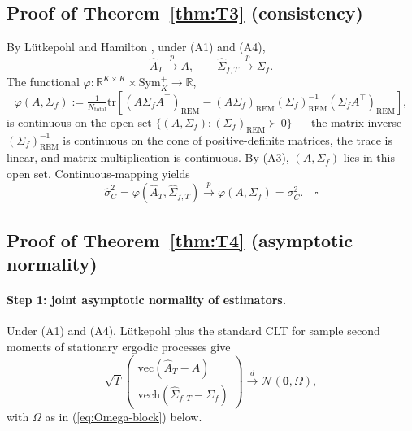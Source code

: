 \documentclass[11pt,letterpaper]{article}
\theoremstyle{remark}
\newcommand{\REM}{\mathrm{REM}}
\newcommand{\Sigmaf}{\Sigma_f}
\newcommand{\Ntot}{N_{\mathrm{total}}}
\newcommand{\sigC}{\sigma^2_C}
\newcommand{\hatsigC}{\widehat{\sigma}^2_C}
\newcommand{\Ehat}{\widehat{A}}
\newcommand{\trace}{\mathrm{tr}}
\newcommand{\vech}{\mathrm{vech}}
\begin{document}
\subsection{Proof of Theorem~\ref{thm:T3} (consistency)}

By Lütkepohl \cite[Proposition~3.1, p.~74]{Lutkepohl2005} and Hamilton \cite[Proposition~11.1, p.~298]{Hamilton1994}, under (A1) and (A4),
\begin{equation*}
\Ehat_T \xrightarrow{p} A, \qquad \widehat{\Sigma}_{f, T} \xrightarrow{p} \Sigmaf.
\end{equation*}
The functional $\varphi : \mathbb{R}^{K \times K} \times \mathrm{Sym}_K^+ \to \mathbb{R}$,
\begin{equation*}
\varphi(A, \Sigmaf) := \tfrac{1}{\Ntot} \trace\!\left[(A \Sigmaf A^\top)_\REM - (A \Sigmaf)_\REM (\Sigmaf)_\REM^{-1} (\Sigmaf A^\top)_\REM\right],
\end{equation*}
is continuous on the open set $\{(A, \Sigmaf) : (\Sigmaf)_\REM \succ 0\}$ --- the matrix inverse $(\Sigmaf)_\REM^{-1}$ is continuous on the cone of positive-definite matrices, the trace is linear, and matrix multiplication is continuous. By (A3), $(A, \Sigmaf)$ lies in this open set. Continuous-mapping yields
\begin{equation*}
\hatsigC = \varphi(\Ehat_T, \widehat{\Sigma}_{f, T}) \xrightarrow{p} \varphi(A, \Sigmaf) = \sigC. \quad \square
\end{equation*}

\subsection{Proof of Theorem~\ref{thm:T4} (asymptotic normality)}

\paragraph{Step 1: joint asymptotic normality of estimators.} Under (A1) and (A4), Lütkepohl \cite[\S 3.2.2, Proposition~3.1, p.~74]{Lutkepohl2005} plus the standard CLT for sample second moments of stationary ergodic processes give
\begin{equation*}
\sqrt{T} \begin{pmatrix} \mathrm{vec}(\Ehat_T - A) \\ \vech(\widehat{\Sigma}_{f, T} - \Sigmaf) \end{pmatrix} \xrightarrow{d} \mathcal{N}(\mathbf{0}, \Omega),
\end{equation*}
with $\Omega$ as in (\ref{eq:Omega-block}) below.
\end{document}
